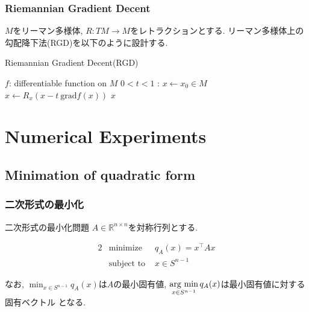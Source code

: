\documentclass[dvipdfmx,11pt]{beamer}		%
\makeatletter
\newcommand{\R}{\mathbb{R}}
\newcommand{\argmin}{\mathop{\rm arg~min}\limits}
\newcounter{mpproblem}[section]
\newenvironment{mpproblem}[1]%
{%
    \protected@edef\@currentlabelname{#1}%
    \par\vspace{\baselineskip}\noindent%
    \ifx#1\empty %
    \else \refstepcounter{mpproblem}$($#1$)$ %
    \fi%
    \hfill%
    $\left|%
    \hfill%
    \hspace{0.00\textwidth}%
    \@fleqntrue\@mathmargin\parindent%
    \begin{minipage}{0.86\textwidth}%
    \vspace{-1.0\baselineskip}%
}%
{%
    \end{minipage}%
    \@fleqnfalse%
    \right.$%
    \par\vspace{\baselineskip}\noindent%
    \ignorespacesafterend%
}%
\newenvironment{mpproblem*}%
{%
    \begin{mpproblem}{}%
}%
{%
    \end{mpproblem}%
    \ignorespacesafterend%
}
\makeatother
\begin{document}
    \begin{frame}\frametitle{Riemannian Gradient Decent}
        $M$をリーマン多様体, $R : TM\to M$をレトラクションとする.
        リーマン多様体上の勾配降下法(RGD)を以下のように設計する.
        \begin{algorithm}[H]
            \caption{Riemannian Gradient Decent(RGD)}
            \begin{algorithmic}
                \REQUIRE $f$: differentiable function on $M$
                \REQUIRE $0< t <1$ : 
                \STATE $x\leftarrow x_{0}\in M$
                \STATE $x\leftarrow R_x(x - t~\mathrm{grad} f(x))$ 
                \ENDWHILE
                \RETURN $x$
            \end{algorithmic}
        \end{algorithm}
    \end{frame}
    \section{Numerical Experiments}
    
    \subsection{Minimation of quadratic form}
    \begin{frame}
        \frametitle{二次形式の最小化}
        \begin{block}{二次形式の最小化問題}
            $A\in\R^{n\times n}$を対称行列とする. 
            \begin{mpproblem*}
                \begin{alignat*}{2}
                    &\text{minimize}   & q_A(x) = x^{\top}Ax  \\
                    &\text{subject to } & x\in S^{n - 1}  
                \end{alignat*}
            \end{mpproblem*}
        \end{block}
        なお, $\displaystyle \min_{x\in S^{n - 1}} q_A(x)$は$A$の最小固有値, $\argmin_{x\in S^{n - 1}}q_A(x)$は最小固有値に対する固有ベクトル
        となる.
    \end{frame}
\end{document}
